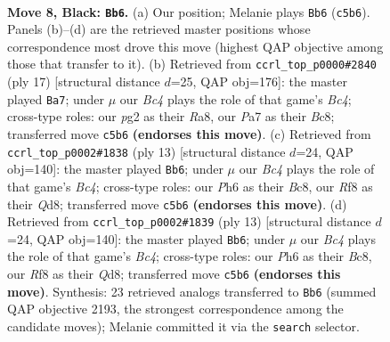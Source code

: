 \documentclass[11pt]{article}
\begin{document}
\begin{figure}[p]\centering
\begin{subfigure}{0.46\textwidth}\centering
\resizebox{\linewidth}{!}{%
\newchessgame
\chessboard[
  setfen={r1bq1rk1/ppp2pp1/2np1n1p/2b1p3/1PB1P2P/2PP1N2/P4PP1/RNBQ1RK1 b - - 0 8},
  showmover=false,
  pgfstyle=straightmove, color=movearrow, markmove={c5-b6}
]}
\caption{}
\end{subfigure}\hfill
\begin{subfigure}{0.46\textwidth}\centering
\resizebox{\linewidth}{!}{%
\newchessgame
\chessboard[
  setfen={r1bq1rk1/1pp2pp1/p1np1n1p/2b1p3/PPB1P3/2PP1N2/5PPP/RNBQR1K1 b - - 0 9},
  showmover=false,
  pgfstyle=straightmove, color=movearrow, markmove={c5-a7}
]}
\caption{}
\end{subfigure}
\\[4pt]
\begin{subfigure}{0.46\textwidth}\centering
\resizebox{\linewidth}{!}{%
\newchessgame
\chessboard[
  setfen={r1bqk2r/ppp2pp1/2np1n1p/2b1p3/1PB1P3/2PP1N2/P4PPP/RNBQ1RK1 b kq - 0 7},
  showmover=false,
  pgfstyle=straightmove, color=movearrow, markmove={c5-b6}
]}
\caption{}
\end{subfigure}\hfill
\begin{subfigure}{0.46\textwidth}\centering
\resizebox{\linewidth}{!}{%
\newchessgame
\chessboard[
  setfen={r1bqk2r/ppp2pp1/2np1n1p/2b1p3/1PB1P3/2PP1N2/P4PPP/RNBQ1RK1 b kq - 0 7},
  showmover=false,
  pgfstyle=straightmove, color=movearrow, markmove={c5-b6}
]}
\caption{}
\end{subfigure}
\caption{\textbf{Move 8, Black: \texttt{Bb6}.} (a) Our position; Melanie plays \texttt{Bb6} (\texttt{c5b6}). Panels (b)--(d) are the retrieved master positions whose correspondence most drove this move (highest QAP objective among those that transfer to it). (b) Retrieved from \texttt{ccrl\_top\_p0000\#2840} (ply 17) [structural distance $d$=25, QAP obj=176]: the master played \texttt{Ba7}; under $\mu$ our \emph{Bc4} plays the role of that game's \emph{Bc4}; cross-type roles: our \emph{p}g2 as their \emph{R}a8, our \emph{P}a7 as their \emph{B}c8; transferred move \texttt{c5b6} \textbf{(endorses this move)}. (c) Retrieved from \texttt{ccrl\_top\_p0002\#1838} (ply 13) [structural distance $d$=24, QAP obj=140]: the master played \texttt{Bb6}; under $\mu$ our \emph{Bc4} plays the role of that game's \emph{Bc4}; cross-type roles: our \emph{P}h6 as their \emph{B}c8, our \emph{R}f8 as their \emph{Q}d8; transferred move \texttt{c5b6} \textbf{(endorses this move)}. (d) Retrieved from \texttt{ccrl\_top\_p0002\#1839} (ply 13) [structural distance $d$=24, QAP obj=140]: the master played \texttt{Bb6}; under $\mu$ our \emph{Bc4} plays the role of that game's \emph{Bc4}; cross-type roles: our \emph{P}h6 as their \emph{B}c8, our \emph{R}f8 as their \emph{Q}d8; transferred move \texttt{c5b6} \textbf{(endorses this move)}. Synthesis: 23 retrieved analogs transferred to \texttt{Bb6} (summed QAP objective 2193, the strongest correspondence among the candidate moves); Melanie committed it via the \texttt{search} selector.}
\label{fig:thought-m15}
\end{figure}
\end{document}
